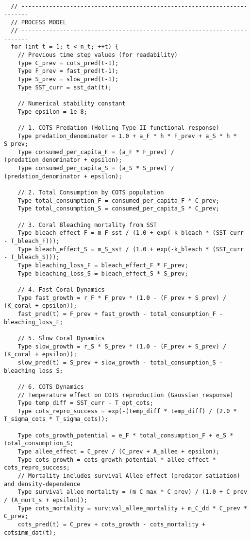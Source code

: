 \begin{lstlisting}
  // ------------------------------------------------------------------------
  // PROCESS MODEL
  // ------------------------------------------------------------------------
  for (int t = 1; t < n_t; ++t) {
    // Previous time step values (for readability)
    Type C_prev = cots_pred(t-1);
    Type F_prev = fast_pred(t-1);
    Type S_prev = slow_pred(t-1);
    Type SST_curr = sst_dat(t);

    // Numerical stability constant
    Type epsilon = 1e-8;

    // 1. COTS Predation (Holling Type II functional response)
    Type predation_denominator = 1.0 + a_F * h * F_prev + a_S * h * S_prev;
    Type consumed_per_capita_F = (a_F * F_prev) / (predation_denominator + epsilon);
    Type consumed_per_capita_S = (a_S * S_prev) / (predation_denominator + epsilon);

    // 2. Total Consumption by COTS population
    Type total_consumption_F = consumed_per_capita_F * C_prev;
    Type total_consumption_S = consumed_per_capita_S * C_prev;

    // 3. Coral Bleaching mortality from SST
    Type bleach_effect_F = m_F_sst / (1.0 + exp(-k_bleach * (SST_curr - T_bleach_F)));
    Type bleach_effect_S = m_S_sst / (1.0 + exp(-k_bleach * (SST_curr - T_bleach_S)));
    Type bleaching_loss_F = bleach_effect_F * F_prev;
    Type bleaching_loss_S = bleach_effect_S * S_prev;

    // 4. Fast Coral Dynamics
    Type fast_growth = r_F * F_prev * (1.0 - (F_prev + S_prev) / (K_coral + epsilon));
    fast_pred(t) = F_prev + fast_growth - total_consumption_F - bleaching_loss_F;

    // 5. Slow Coral Dynamics
    Type slow_growth = r_S * S_prev * (1.0 - (F_prev + S_prev) / (K_coral + epsilon));
    slow_pred(t) = S_prev + slow_growth - total_consumption_S - bleaching_loss_S;

    // 6. COTS Dynamics
    // Temperature effect on COTS reproduction (Gaussian response)
    Type temp_diff = SST_curr - T_opt_cots;
    Type cots_repro_success = exp(-(temp_diff * temp_diff) / (2.0 * T_sigma_cots * T_sigma_cots));
    
    Type cots_growth_potential = e_F * total_consumption_F + e_S * total_consumption_S;
    Type allee_effect = C_prev / (C_prev + A_allee + epsilon);
    Type cots_growth = cots_growth_potential * allee_effect * cots_repro_success;
    // Mortality includes survival Allee effect (predator satiation) and density-dependence
    Type survival_allee_mortality = (m_C_max * C_prev) / (1.0 + C_prev / (A_mort_s + epsilon));
    Type cots_mortality = survival_allee_mortality + m_C_dd * C_prev * C_prev;
    cots_pred(t) = C_prev + cots_growth - cots_mortality + cotsimm_dat(t);


\end{lstlisting}
